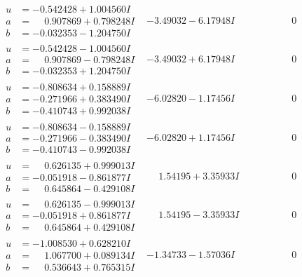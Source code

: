 \documentclass[1p]{elsarticle_modified}
\theoremstyle{definition}
\begin{document}
$$\begin{array}{c|c|c}
\begin{aligned}
u &= -0.542428 + 1.004560 I \\
a &= \phantom{-}0.907869 + 0.798248 I \\
b &= -0.032353 - 1.204750 I\end{aligned}
 & -3.49032 - 6.17948 I & \phantom{-0.000000 } 0 \\ \hline\begin{aligned}
u &= -0.542428 - 1.004560 I \\
a &= \phantom{-}0.907869 - 0.798248 I \\
b &= -0.032353 + 1.204750 I\end{aligned}
 & -3.49032 + 6.17948 I & \phantom{-0.000000 } 0 \\ \hline\begin{aligned}
u &= -0.808634 + 0.158889 I \\
a &= -0.271966 + 0.383490 I \\
b &= -0.410743 + 0.992038 I\end{aligned}
 & -6.02820 - 1.17456 I & \phantom{-0.000000 } 0 \\ \hline\begin{aligned}
u &= -0.808634 - 0.158889 I \\
a &= -0.271966 - 0.383490 I \\
b &= -0.410743 - 0.992038 I\end{aligned}
 & -6.02820 + 1.17456 I & \phantom{-0.000000 } 0 \\ \hline\begin{aligned}
u &= \phantom{-}0.626135 + 0.999013 I \\
a &= -0.051918 - 0.861877 I \\
b &= \phantom{-}0.645864 - 0.429108 I\end{aligned}
 & \phantom{-}1.54195 + 3.35933 I & \phantom{-0.000000 } 0 \\ \hline\begin{aligned}
u &= \phantom{-}0.626135 - 0.999013 I \\
a &= -0.051918 + 0.861877 I \\
b &= \phantom{-}0.645864 + 0.429108 I\end{aligned}
 & \phantom{-}1.54195 - 3.35933 I & \phantom{-0.000000 } 0 \\ \hline\begin{aligned}
u &= -1.008530 + 0.628210 I \\
a &= \phantom{-}1.067700 + 0.089134 I \\
b &= \phantom{-}0.536643 + 0.765315 I\end{aligned}
 & -1.34733 - 1.57036 I & \phantom{-0.000000 } 0 \\ \hline\begin{aligned}

\end{aligned}
\end{array}$$
\end{document}
